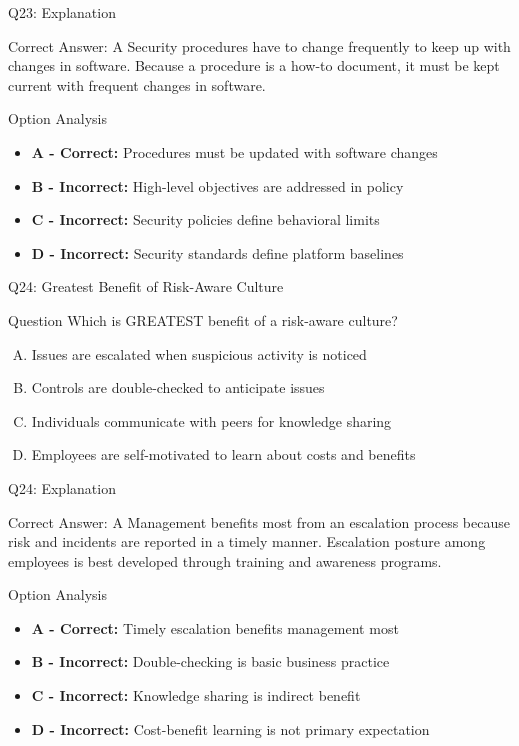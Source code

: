 \documentclass{beamer}
\begin{document}
	\begin{frame}{Q23: Explanation}
		\begin{block}{Correct Answer: A}
			Security procedures have to change frequently to keep up with changes in software. Because a procedure is a how-to document, it must be kept current with frequent changes in software.
		\end{block}
		\begin{block}{Option Analysis}
			\begin{itemize}
				\item \textbf{A - Correct:} Procedures must be updated with software changes
				\item \textbf{B - Incorrect:} High-level objectives are addressed in policy
				\item \textbf{C - Incorrect:} Security policies define behavioral limits
				\item \textbf{D - Incorrect:} Security standards define platform baselines
			\end{itemize}
		\end{block}
	\end{frame}
	
	\begin{frame}{Q24: Greatest Benefit of Risk-Aware Culture}
		\begin{block}{Question}
			Which is GREATEST benefit of a risk-aware culture?
		\end{block}
		\begin{enumerate}[(A)]
			\item Issues are escalated when suspicious activity is noticed
			\item Controls are double-checked to anticipate issues
			\item Individuals communicate with peers for knowledge sharing
			\item Employees are self-motivated to learn about costs and benefits
		\end{enumerate}
	\end{frame}
	
	\begin{frame}{Q24: Explanation}
		\begin{block}{Correct Answer: A}
			Management benefits most from an escalation process because risk and incidents are reported in a timely manner. Escalation posture among employees is best developed through training and awareness programs.
		\end{block}
		\begin{block}{Option Analysis}
			\begin{itemize}
				\item \textbf{A - Correct:} Timely escalation benefits management most
				\item \textbf{B - Incorrect:} Double-checking is basic business practice
				\item \textbf{C - Incorrect:} Knowledge sharing is indirect benefit
				\item \textbf{D - Incorrect:} Cost-benefit learning is not primary expectation
			\end{itemize}
		\end{block}
	\end{frame}
	
\end{document}
